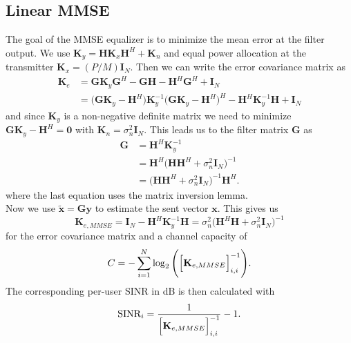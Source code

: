 \subsection{Linear MMSE}
The goal of the MMSE equalizer is to minimize the mean error at the filter output. We use $\mathbf{K}_y = \mathbf{HK}_x\mathbf{H}^H + \mathbf{K}_n$ and equal power allocation at the transmitter $\mathbf{K}_x = (P/M)\mathbf{I}_N$. Then we can write the error covariance matrix as
\begin{align}
	\mathbf{K}_e &= \mathbf{GK}_y\mathbf{G}^H - \mathbf{GH} - \mathbf{H}^H\mathbf{G}^H + \mathbf{I}_N\\
	&=\Biggr(\mathbf{GK}_y - \mathbf{H}^H\Biggl) \mathbf{K}_y^{-1} \Biggr(\mathbf{GK}_y - \mathbf{H}^H\Biggl)^H - \mathbf{H}^H\mathbf{K}_y^{-1}\mathbf{H}+\mathbf{I}_N
\end{align}
and since $\mathbf{K}_y$ is a non-negative definite matrix we need to minimize $\mathbf{GK}_y-\mathbf{H}^H=\mathbf{0}$ with $\mathbf{K}_n = \sigma_n^2\mathbf{I}_N$. This leads us to the filter matrix $\mathbf{G}$ as
\begin{align}
	\mathbf{G} &= \mathbf{H}^H\mathbf{K}_y^{-1}\\
	&= \mathbf{H}^H\Biggr(\mathbf{HH}^H + \sigma_n^2\mathbf{I}_N\Biggl)^{-1}\\
	&=\Biggr(\mathbf{HH}^H + \sigma_n^2\mathbf{I}_N\Biggl)^{-1}\mathbf{H}^H.
\end{align}
where the last equation uses the matrix inversion lemma.\\
Now we use $\mathbf{\tilde{x}} = \mathbf{Gy}$ to estimate the sent vector $\mathbf{x}$. This gives us
\begin{equation}
	\mathbf{K}_{e,MMSE} = \mathbf{I}_N - \mathbf{H}^H\mathbf{K}_y^{-1}\mathbf{H} = \sigma_n^2\Biggr(\mathbf{H}^H\mathbf{H} + \sigma_n^2\mathbf{I}_N\Biggl)^{-1}
\end{equation}
for the error covariance matrix and a channel capacity of
\begin{equation}
	C = -\sum_{i=1}^{N}{\log_2{\Biggr(\Bigr[\mathbf{K}_{e,MMSE}\Bigl]_{i,i}^{-1}\Biggl)}}.
\end{equation}
The corresponding per-user SINR in dB is then calculated with
\begin{equation}
	\text{SINR}_{i} = \frac{1}{\Bigr[\mathbf{K}_{e,MMSE}\Bigl]_{i,i}^{-1}} - 1.
\end{equation}

